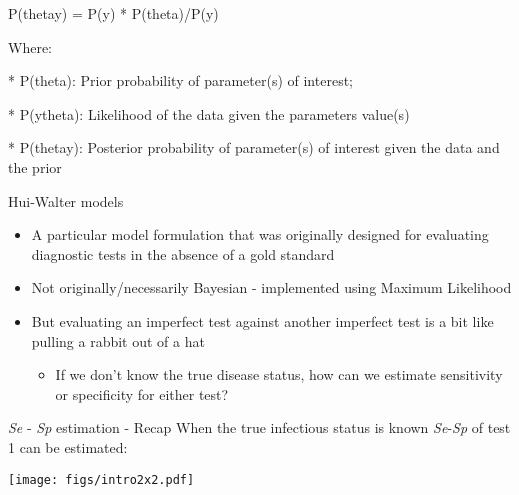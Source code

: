 \documentclass[
  ignorenonframetext,
]{beamer}
\providecommand{\tightlist}{%
  \setlength{\itemsep}{0pt}\setlength{\parskip}{0pt}}
\begin{document}
\begin{frame}{P(theta\textbar y) = P(y\textbar{}\theta) * P(theta)/P(y)}
\protect\hypertarget{pthetay-py-pthetapy}{}
\end{frame}

\begin{frame}{Where:}
\protect\hypertarget{where}{}
\end{frame}

\begin{frame}{* P(theta): Prior probability of parameter(s) of
interest;}
\protect\hypertarget{ptheta-prior-probability-of-parameters-of-interest}{}
\end{frame}

\begin{frame}{* P(y\textbar theta): Likelihood of the data given the
parameters value(s)}
\protect\hypertarget{pytheta-likelihood-of-the-data-given-the-parameters-values}{}
\end{frame}

\begin{frame}{* P(theta\textbar y): Posterior probability of
parameter(s) of interest given the data and the prior}
\protect\hypertarget{pthetay-posterior-probability-of-parameters-of-interest-given-the-data-and-the-prior}{}
\begin{block}{Hui-Walter models}
\protect\hypertarget{hui-walter-models}{}
\begin{itemize}
\item
  A particular model formulation that was originally designed for
  evaluating diagnostic tests in the absence of a gold standard
\item
  Not originally/necessarily Bayesian - implemented using Maximum
  Likelihood
\item
  But evaluating an imperfect test against another imperfect test is a
  bit like pulling a rabbit out of a hat

  \begin{itemize}
  \tightlist
  \item
    If we don't know the true disease status, how can we estimate
    sensitivity or specificity for either test?
  \end{itemize}
\end{itemize}
\end{block}
\end{frame}

\begin{frame}
\begin{block}{\emph{Se} - \emph{Sp} estimation - Recap}
\protect\hypertarget{se---sp-estimation---recap}{}
When the true infectious status is known \emph{Se}-\emph{Sp} of test 1
can be estimated:

\texttt{[image: figs/intro2x2.pdf]}
\end{block}
\end{frame}
\end{document}
